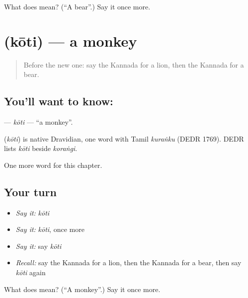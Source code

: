\begin{tcolorbox}[breakable,colback=teal!4,colframe=teal!35!black,title={Before you move on}]
What does  mean? (\textquotedblleft{}A bear\textquotedblright{}.) Say it once more.
\end{tcolorbox}
\section[\texorpdfstring{\kn{ಕೋತಿ} (kōti)}{ಕೋತಿ (kōti)}]{ (kōti) — a monkey}

\label{lesson:KA-C130-koti}



\begin{quote}
Before the new one: say the Kannada for a lion, then the Kannada for a bear.
\end{quote}

\subsection*{You'll want to know: }
\textbf{} — \emph{kōti} — \textquotedblleft{}a monkey\textquotedblright{}.

\begin{cousinweb}
\textbf{} (\emph{kōti}) is native Dravidian, one word with Tamil \emph{kuraṅku} (DEDR 1769). DEDR lists \emph{kōti} beside \emph{koraṅgi}.
\end{cousinweb}

\begin{grammarlens}[title={What you've built}]
One more word for this chapter.
\end{grammarlens}

\subsection*{Your turn}
\begin{itemize}
\raggedright
  \item \emph{Say it:} \emph{kōti}
  \item \emph{Say it:} \emph{kōti}, once more
  \item \emph{Say it:} say \emph{kōti}
  \item \emph{Recall:} say the Kannada for a lion, then the Kannada for a bear, then say \emph{kōti} again
\end{itemize}

\begin{tcolorbox}[breakable,colback=teal!4,colframe=teal!35!black,title={Before you move on}]
What does  mean? (\textquotedblleft{}A monkey\textquotedblright{}.) Say it once more.
\end{tcolorbox}
